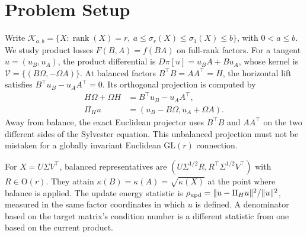 \section{Problem Setup}
Write $\mathcal K_{a,b}=\{X:\operatorname{rank}(X)=r,\ a\leq\sigma_r(X)\leq\sigma_1(X)\leq b\}$, with $0<a\leq b$. We study product losses $F(B,A)=f(BA)$ on full-rank factors. For a tangent $u=(u_B,u_A)$, the product differential is $D\pi[u]=u_BA+Bu_A$, whose kernel is $\mathcal V=\{(B\Omega,-\Omega A)\}$. At balanced factors $B^\top B=AA^\top=H$, the horizontal lift satisfies $B^\top u_B-u_AA^\top=0$. Its orthogonal projection is computed by
\begin{equation}
\begin{aligned}
H\Omega+\Omega H&=B^\top u_B-u_AA^\top,\\
\Pi_Hu&=(u_B-B\Omega,u_A+\Omega A).
\end{aligned}
 \label{eq:sylvester_connection}
\end{equation}
Away from balance, the exact Euclidean projector uses $B^\top B$ and $AA^\top$ on the two different sides of the Sylvester equation. This unbalanced projection must not be mistaken for a globally invariant Euclidean $\mathrm{GL}(r)$ connection.

For $X=U\Sigma V^\top$, balanced representatives are $(U\Sigma^{1/2}R,R^\top\Sigma^{1/2}V^\top)$ with $R\in\mathrm O(r)$. They attain $\kappa(B)=\kappa(A)=\sqrt{\kappa(X)}$ at the point where balance is applied. The update energy statistic is $\rho_{\rm upd}=\|u-\Pi_Hu\|^2/\|u\|^2$, measured in the same factor coordinates in which $u$ is defined. A denominator based on the target matrix's condition number is a different statistic from one based on the current product.

